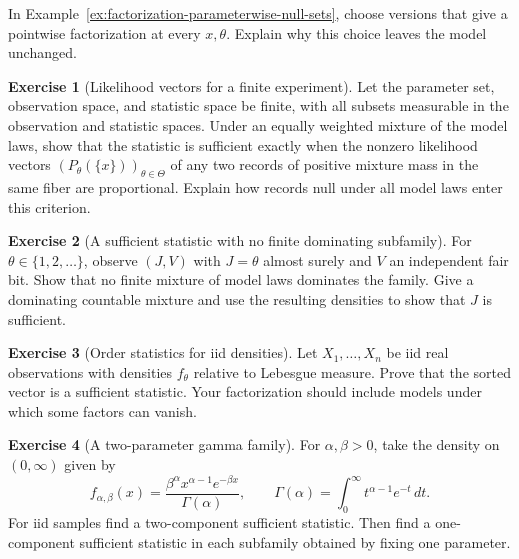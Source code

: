 \documentclass[11pt,oneside]{book}
\theoremstyle{definition}
\newtheorem{exercise}{Exercise}[section]
\theoremstyle{remark}
\begin{document}
\begin{practiceexercise}
\label{pex:factorization-pointwise-versions}
In Example~\ref{ex:factorization-parameterwise-null-sets},
choose versions that give a pointwise factorization at every
$x,\theta$. Explain why this choice leaves the model unchanged.
\end{practiceexercise}

\begin{exercise}[Likelihood vectors for a finite experiment]
\label{exer:factorization-finite-likelihood-vectors}
Let the parameter set, observation space, and statistic space be
finite, with all subsets measurable in the observation and
statistic spaces. Under an equally weighted mixture of the model laws,
show that the statistic is sufficient exactly when the nonzero
likelihood vectors $(P_\theta(\{x\}))_{\theta\in\Theta}$ of any two
records of positive mixture mass in the same fiber are proportional. Explain how records null under all model
laws enter this criterion.
\end{exercise}

\begin{exercise}[A sufficient statistic with no finite dominating subfamily]
\label{exer:factorization-infinite-dominating-mixture}
For $\theta\in\{1,2,\ldots\}$, observe $(J,V)$ with $J=\theta$
almost surely and $V$ an independent fair bit. Show that no
finite mixture of model laws dominates the family. Give a
dominating countable mixture and use the resulting densities
to show that $J$ is sufficient.
\end{exercise}

\begin{exercise}[Order statistics for iid densities]
\label{exer:factorization-order-statistics}
Let $X_1,\ldots,X_n$ be iid real observations with densities
$f_\theta$ relative to Lebesgue measure. Prove that the
sorted vector is a sufficient statistic. Your factorization
should include models under which some factors can vanish.
\end{exercise}

\begin{exercise}[A two-parameter gamma family]
\label{exer:factorization-gamma-two-parameters}
For $\alpha,\beta>0$, take the density on $(0,\infty)$ given by
\[
f_{\alpha,\beta}(x)=\frac{\beta^\alpha x^{\alpha-1}e^{-\beta x}}
{\Gamma(\alpha)},\qquad
\Gamma(\alpha)=\int_0^\infty t^{\alpha-1}e^{-t}\,dt.
\]
For iid samples find a two-component sufficient statistic.
Then find a one-component sufficient statistic in each
subfamily obtained by fixing one parameter.
\end{exercise}
\end{document}
